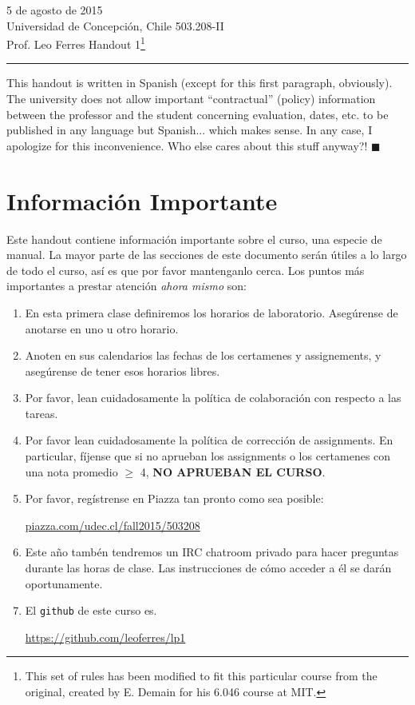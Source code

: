 \documentclass[11pt]{article}
\begin{document}
\thispagestyle{empty}

 \hfill 5 de agosto de 2015\\
\noindent  Universidad de Concepci\'on, Chile  \hfill 503.208-II\\
\noindent Prof. Leo Ferres \hfill Handout 1\footnote{This set of rules
  has been modified to fit this particular course from the original,
  created by E. Demain for his 6.046 course at MIT.}
\rule{\textwidth}{0.4pt}

\vspace{0.4in}
 This handout is written in Spanish (except for this
first paragraph, obviously). The university does not allow important
``contractual'' (policy) information between the professor and the
student concerning evaluation, dates, etc. to be published in any
language but Spanish... which makes sense. In any case, I apologize
for this inconvenience. Who else cares about this stuff anyway?!
$\blacksquare$

\section*{Informaci\'on Importante}

Este handout contiene informaci\'on importante sobre el curso, una
especie de manual. La mayor parte de las secciones de este documento
ser\'an \'utiles a lo largo de todo el curso, as\'i es que por favor
mantenganlo cerca. Los puntos m\'as importantes a prestar atenci\'on
{\em ahora mismo} son:

\begin{enumerate}
\item En esta primera clase definiremos los horarios de
  laboratorio. Aseg\'urense de anotarse en uno u otro horario.
\item Anoten en sus calendarios las fechas de los certamenes y
  assignements, y aseg\'urense de tener esos horarios libres.
\item Por favor, lean cuidadosamente la pol\'itica de colaboraci\'on con
  respecto a las tareas.
\item Por favor lean cuidadosamente la pol\'itica de correcci\'on de
  assignments. En particular, f\'ijense que si no aprueban los
  assignments o los certamenes con una nota promedio $\geq$ 4, {\bf NO
    APRUEBAN EL CURSO}.
\item Por favor, reg\'istrense en Piazza tan pronto como sea posible:
  \begin{center}
      \url{piazza.com/udec.cl/fall2015/503208}
  \end{center}
\item Este a\~no tamb\'en tendremos un IRC chatroom privado para hacer
  preguntas durante las horas de clase. Las instrucciones de c\'omo
  acceder a \'el se dar\'an oportunamente.
\item El \verb+github+ de este curso es.
  \begin{center}
      \url{https://github.com/leoferres/lp1}
  \end{center}

\end{enumerate}
\end{document}

